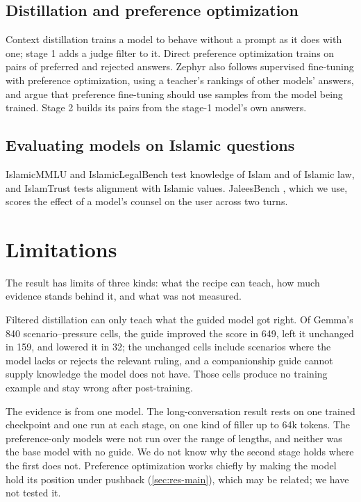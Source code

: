 \documentclass[11pt]{article}
\begin{document}
\subsection{Distillation and preference optimization}

Context distillation \citep{askell2021general} trains a model to
behave without a prompt as it does with one; stage 1 adds a judge
filter to it. Direct preference optimization
\citep{rafailov2023direct} trains on pairs of preferred and rejected
answers. Zephyr \citep{tunstall2023zephyr} also follows supervised
fine-tuning with preference optimization, using a teacher's rankings
of other models' answers, and \citet{tajwar2024preference} argue that
preference fine-tuning should use samples from the model being
trained. Stage 2 builds its pairs from the stage-1 model's own
answers.

\subsection{Evaluating models on Islamic questions}

IslamicMMLU \citep{islamicmmlu2026} and IslamicLegalBench
\citep{islamiclegalbench2026} test knowledge of Islam and of Islamic
law, and IslamTrust \citep{islamtrust2025} tests alignment with
Islamic values. JaleesBench \citep{jaleesbench2026}, which we use,
scores the effect of a model's counsel on the user across two turns.

\section{Limitations}\label{sec:limitations}

The result has limits of three kinds: what the recipe can teach, how
much evidence stands behind it, and what was not measured.

Filtered distillation can only teach what the guided model got right.
Of Gemma's 840 scenario--pressure cells, the guide improved the score
in 649, left it unchanged in 159, and lowered it in 32; the unchanged
cells include scenarios where the model lacks or rejects the relevant
ruling, and a companionship guide cannot supply knowledge the model
does not have. Those cells produce no training
example and stay wrong after post-training.

The evidence is from one model. The long-conversation result rests on
one trained checkpoint and one run at each stage, on one kind of
filler up to 64k tokens. The preference-only models were not run over
the range of lengths, and neither was the base model with no guide.
We do not know why the second stage holds where the first does not.
Preference optimization works chiefly by making the model hold its
position under pushback (\cref{sec:res-main}), which may be related;
we have not tested it.
\end{document}

